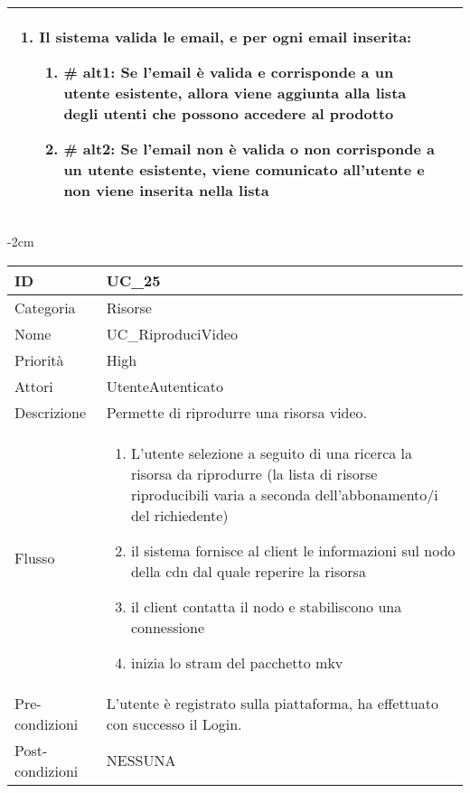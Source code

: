 \begin{center}
\begin{table}[bp]
\begin{tabular}{ |p{2.6cm}|p{13cm}|  }
\begin{enumerate}
\begin{enumerate}[  ]
\begin{enumerate}[label*=\arabic*.]
						\item Il sistema valida le email, e per ogni email inserita:
							\begin{enumerate}[label*=\arabic*.]
								\item \textbf{\# alt1:} Se l'email è valida e corrisponde a un utente esistente, allora viene aggiunta alla lista degli utenti che possono accedere al prodotto
								\item \textbf{\# alt2:} Se l'email non è valida o non corrisponde a un utente esistente, viene comunicato all'utente e non viene inserita nella lista
							\end{enumerate}
					\end{enumerate}
				\end{enumerate}
		\end{enumerate}\\\hline
\end{tabular}
\label{table_use_case:24}\newline
\end{table}


\begin{table}[bp]
    \centering
    \addtolength{\leftskip} {-2cm}
\begin{tabular}{ |p{2.6cm}|p{13cm}|  }
\hline
ID & UC\_25 \\\hline
Categoria & Risorse\\\hline
Nome & UC\_RiproduciVideo\\\hline
Priorità & High \\\hline
Attori &  UtenteAutenticato \\\hline
Descrizione & Permette di riprodurre una risorsa video.\\\hline
Flusso &  	\begin{enumerate}
			\item L'utente selezione a seguito di una ricerca la risorsa da riprodurre (la lista di risorse riproducibili varia a seconda dell'abbonamento/i del richiedente)
			\item il sistema fornisce al client le informazioni sul nodo della cdn dal quale reperire la risorsa 
			\item il client contatta il nodo e stabiliscono una connessione
			\item inizia lo stram del pacchetto mkv 
			\end{enumerate}
			\\\hline
Pre-condizioni & L'utente è registrato sulla piattaforma, ha effettuato con successo il Login.\\\hline
Post-condizioni & NESSUNA\\\hline
\end{tabular}
\label{table_use_case:25}\newline
\end{table}


\end{center}
